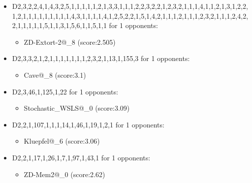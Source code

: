 \begin{appendices}
\begin{itemize}
        \item D2,3,2,2,4,1,4,3,2,5,1,1,1,1,1,2,1,3,3,1,1,1,2,2,3,2,2,1,2,3,2,1,1,1,4,1,1,2,1,3,1,2,2,1,2,1,1,1,1,1,1,1,1,1,4,3,1,1,1,1,4,1,2,5,2,2,1,5,1,4,2,1,1,1,2,1,1,1,2,3,2,1,1,1,2,4,2,2,1,1,1,1,1,5,1,1,3,1,5,6,1,1,5,1,1 for 1 opponents:
        \begin{multicols}{3}
            \begin{itemize}
                \item ZD-Extort-2@\_8 (score:2.505)
            \end{itemize}
        \end{multicols}

        \item D2,3,3,2,1,2,1,1,1,1,1,1,1,2,3,2,1,13,1,155,3 for 1 opponents:
        \begin{multicols}{3}
            \begin{itemize}
                \item Cave@\_8 (score:3.1)
            \end{itemize}
        \end{multicols}

        \item D2,3,46,1,125,1,22 for 1 opponents:
        \begin{multicols}{3}
            \begin{itemize}
                \item Stochastic\_WSLS@\_0 (score:3.09)
            \end{itemize}
        \end{multicols}

        \item D2,2,1,107,1,1,1,14,1,46,1,19,1,2,1 for 1 opponents:
        \begin{multicols}{3}
            \begin{itemize}
                \item Kluepfel@\_6 (score:3.06)
            \end{itemize}
        \end{multicols}

        \item D2,2,1,17,1,26,1,7,1,97,1,43,1 for 1 opponents:
        \begin{multicols}{3}
            \begin{itemize}
                \item ZD-Mem2@\_0 (score:2.62)
            \end{itemize}
        \end{multicols}


\end{itemize}
\end{appendices}
